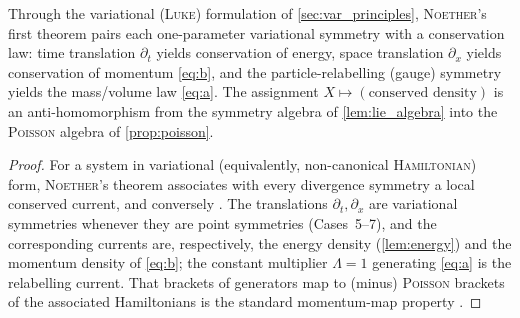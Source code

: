\documentclass[alpha-refs, 12pt]{wiley-article}
\begin{document}
\begin{proposition}\label{prop:noether}
Through the variational (\textsc{Luke}) formulation of \cref{sec:var_principles}, \textsc{Noether}'s first theorem pairs each one-parameter variational symmetry with a conservation law: time translation $\partial_{t}$ yields conservation of energy, space translation $\partial_{x}$ yields conservation of momentum \eqref{eq:b}, and the particle-relabelling (gauge) symmetry yields the mass/volume law \eqref{eq:a}. The assignment $X\mapsto(\text{conserved density})$ is an anti-homomorphism from the symmetry algebra of \cref{lem:lie_algebra} into the \textsc{Poisson} algebra of \cref{prop:poisson}.
\end{proposition}
\begin{proof}
For a system in variational (equivalently, non-canonical \textsc{Hamiltonian}) form, \textsc{Noether}'s theorem associates with every divergence symmetry a local conserved current, and conversely \citep{Olver1993, Bluman2010, Benjamin1982}. The translations $\partial_{t},\partial_{x}$ are variational symmetries whenever they are point symmetries (Cases~5--7), and the corresponding currents are, respectively, the energy density (\cref{lem:energy}) and the momentum density of \eqref{eq:b}; the constant multiplier $\Lambda=1$ generating \eqref{eq:a} is the relabelling current. That brackets of generators map to (minus) \textsc{Poisson} brackets of the associated Hamiltonians is the standard momentum-map property \citep{Olver1993}.
\end{proof}
\end{document}

